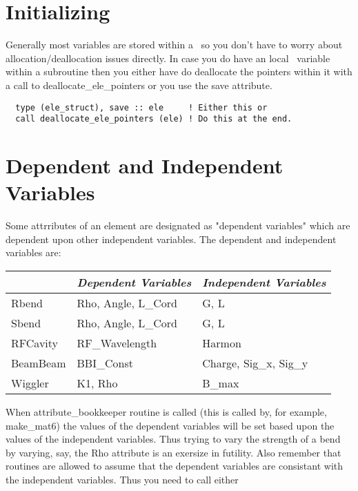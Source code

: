 \section{Initializing}

Generally most \elestruct variables are stored within a \ringstruct\ so
you don't have to worry about allocation/deallocation issues
directly. In case you do have an local \elestruct\ variable within a
subroutine then you either have do deallocate the pointers within it
with a call to {\sn deallocate\_ele\_pointers} or you use the save
attribute.
\begin{verbatim}
  type (ele_struct), save :: ele     ! Either this or
  call deallocate_ele_pointers (ele) ! Do this at the end.
\end{verbatim}


\section{Dependent and Independent Variables}

Some attrributes of an element are designated as "dependent variables"
which are dependent upon other independent variables. The dependent
and independent variables are: \hfil\break
\begin{center}
\begin{tabular}{|l|l|l|} \hline
           & {\em Dependent Variables}  & {\em Independent Variables}\\ \hline
  Rbend    & Rho, Angle, L\_Cord    & G, L                         \\ \hline
  Sbend    & Rho, Angle, L\_Cord    & G, L                         \\ \hline
  RFCavity & RF\_Wavelength         & Harmon                       \\ \hline
  BeamBeam & BBI\_Const             & Charge, Sig\_x, Sig\_y       \\ \hline
  Wiggler  & K1, Rho                & B\_max                       \\ \hline
\end{tabular}
\end{center}

When {\sn attribute\_bookkeeper} routine is called (this is called by,
for example, {\sn make\_mat6}) the values of the dependent variables
will be set based upon the values of the independent variables. Thus
trying to vary the strength of a bend by varying, say, the Rho
attribute is an exersize in futility. Also remember that routines are
allowed to assume that the dependent variables are consistant with the
independent variables. Thus you need to call either

